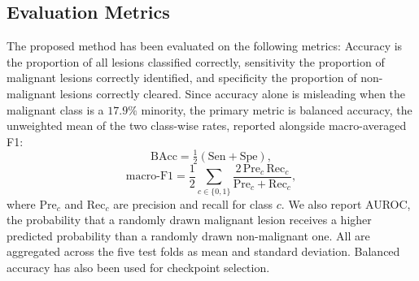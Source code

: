 \documentclass[conference]{IEEEtran}
\begin{document}
\subsection{Evaluation Metrics}
The proposed method has been evaluated on the following metrics:
Accuracy is the proportion of all lesions classified correctly, sensitivity the proportion of malignant lesions correctly identified, and specificity the proportion of non-malignant lesions correctly cleared. Since accuracy alone is misleading when the malignant class is a $17.9\%$ minority, the primary metric is balanced accuracy, the unweighted mean of the two class-wise rates, reported alongside macro-averaged F1:
\begin{equation}
\mathrm{BAcc}=\tfrac{1}{2}\left(\mathrm{Sen}+\mathrm{Spe}\right),
\end{equation}
\begin{equation}
\text{macro-F1}=\frac{1}{2}\sum_{c\in\{0,1\}}\frac{2\,\mathrm{Pre}_c\,\mathrm{Rec}_c}{\mathrm{Pre}_c+\mathrm{Rec}_c},
\end{equation}
where $\mathrm{Pre}_c$ and $\mathrm{Rec}_c$ are precision and recall for class $c$. We also report AUROC, the probability that a randomly drawn malignant lesion receives a higher predicted probability than a randomly drawn non-malignant one. All are aggregated across the five test folds as mean and standard deviation. Balanced accuracy has also been used for checkpoint selection.
\end{document}

